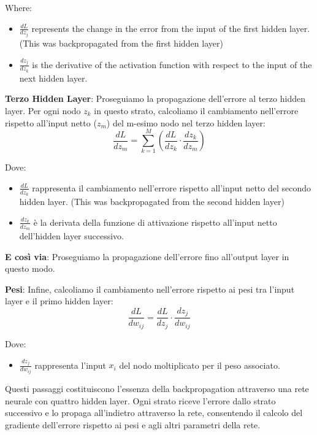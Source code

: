 Where:
\begin{itemize}
    \item \( \frac{d L}{d z_j} \) represents the change in the error from the input of the first hidden layer. (\textcolor{myred}{This was backpropagated from the first hidden layer})
    \item \( \frac{d z_j}{d z_k} \) is the derivative of the activation function with respect to the input of the next hidden layer.
\end{itemize}


\textbf{Terzo Hidden Layer}:
Proseguiamo la propagazione dell'errore al terzo hidden layer. Per ogni nodo \( z_k \) in questo strato, calcoliamo il cambiamento nell'errore rispetto all'input netto (\( z_m \)) del m-esimo nodo nel terzo hidden layer:
\[ \frac{d L}{d z_m} = \sum_{k=1}^{M} \left( \frac{d L}{d z_k} \cdot \frac{d z_k}{d z_m} \right) \]

Dove:
\begin{itemize}
    \item \( \frac{d L}{d z_k} \) rappresenta il cambiamento nell'errore rispetto all'input netto del secondo hidden layer. (\textcolor{myred}{This was backpropagated from the second hidden layer})
    \item \( \frac{d z_k}{d z_m} \) è la derivata della funzione di attivazione rispetto all'input netto dell'hidden layer successivo.
\end{itemize}

\textbf{E così via}:
Proseguiamo la propagazione dell'errore fino all'output layer in questo modo.

\textbf{Pesi}:
Infine, calcoliamo il cambiamento nell'errore rispetto ai pesi tra l'input layer e il primo hidden layer:
\[ \frac{d L}{d w_{ij}} = \frac{d L}{d z_j} \cdot \frac{d z_j}{d w_{ij}} \]

Dove:
\begin{itemize}
    \item \( \frac{d z_j}{d w_{ij}} \) rappresenta l'input \( x_i \) del nodo moltiplicato per il peso associato.
\end{itemize}

Questi passaggi costituiscono l'essenza della backpropagation attraverso una rete neurale con quattro hidden layer. Ogni strato riceve l'errore dallo strato successivo e lo propaga all'indietro attraverso la rete, consentendo il calcolo del gradiente dell'errore rispetto ai pesi e agli altri parametri della rete.
